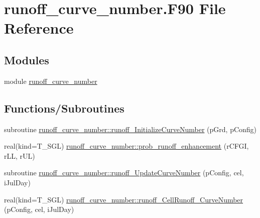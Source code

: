 \hypertarget{runoff__curve__number_8_f90}{
\section{runoff\_\-curve\_\-number.F90 File Reference}
\label{runoff__curve__number_8_f90}
}
\subsection*{Modules}
\begin{DoxyCompactItemize}
\item 
module \hyperlink{namespacerunoff__curve__number}{runoff\_\-curve\_\-number}
\end{DoxyCompactItemize}
\subsection*{Functions/Subroutines}
\begin{DoxyCompactItemize}
\item 
subroutine \hyperlink{namespacerunoff__curve__number_aab87de081fe92b0ca919f00b9931be6d}{runoff\_\-curve\_\-number::runoff\_\-InitializeCurveNumber} (pGrd, pConfig)
\item 
real(kind=T\_\-SGL) \hyperlink{namespacerunoff__curve__number_a3845fae9f1dbb2b84cafe6ce8b0eb623}{runoff\_\-curve\_\-number::prob\_\-runoff\_\-enhancement} (rCFGI, rLL, rUL)
\item 
subroutine \hyperlink{namespacerunoff__curve__number_aa67ff881b9c177ceae2d5f9d1326c2f4}{runoff\_\-curve\_\-number::runoff\_\-UpdateCurveNumber} (pConfig, cel, iJulDay)
\item 
real(kind=T\_\-SGL) \hyperlink{namespacerunoff__curve__number_a91b397a08e97547a3fa4cee3f7fee469}{runoff\_\-curve\_\-number::runoff\_\-CellRunoff\_\-CurveNumber} (pConfig, cel, iJulDay)
\end{DoxyCompactItemize}
